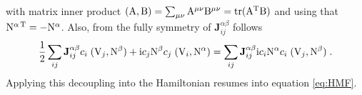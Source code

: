 with matrix inner product $(\mathrm{A} , \mathrm{B}) = \sum_{\mu\nu} \mathrm{A}^{\mu\nu} \mathrm{B}^{\mu\nu} = \mathrm{tr} (\mathrm{A}^{\mathrm{T}} \mathrm{B})$ and using that $\mathrm{N}^{\alpha\, {\mathrm{T}}} = - \mathrm{N}^\alpha$. Also, from the fully symmetry of $\mathbf{J}_{ij}^{\alpha\beta}$ follows
\begin{equation}
  \frac{1}{2} \sum_{ ij }
         \mathbf{J}_{ij}^{\alpha\beta}    c_i  \; ( \mathrm{V}_{j} , \mathrm{N}^\beta )
        + \mathrm{i} c_j \mathrm{N}^\beta  c_j  \; ( \mathrm{V}_{i} , \mathrm{N}^\alpha )  =
       \sum_{ ij }
         \mathbf{J}_{ij}^{\alpha\beta}  \mathrm{i} c_i \mathrm{N}^\alpha  c_i  \; ( \mathrm{V}_{j} , \mathrm{N}^\beta ) \; .
\end{equation}
Applying this decoupling into the Hamiltonian resumes into equation \eqref{eq:HMF}.

